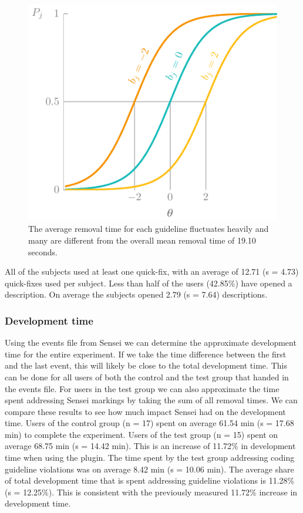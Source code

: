\begin{figure}
  \centering
  \includegraphics[page=19]{03-education/figures/tikzfigures.pdf}
  \caption[Average removal time of guidelines]{The average removal time for each guideline fluctuates heavily and many are different from the overall mean removal time of 19.10 seconds.}
  \label{fig:fixtimes}
\end{figure}

All of the subjects used at least one quick-fix, with an average of 12.71 (s = 4.73) quick-fixes used per subject.
Less than half of the users (42.85\%) have opened a description.
On average the subjects opened 2.79 (s = 7.64) descriptions.

\subsubsection{Development time}
Using the events file from Sensei we can determine the approximate development time for the entire experiment.
If we take the time difference between the first and the last event, this will likely be close to the total development time.
This can be done for all users of both the control and the test group that handed in the events file.
For users in the test group we can also approximate the time spent addressing Sensei markings by taking the sum of all removal times.
We can compare these results to see how much impact Sensei had on the development time.
Users of the control group (n = 17) spent on average 61.54 min (s = 17.68 min) to complete the experiment.
Users of the test group (n = 15) spent on average 68.75 min (s = 14.42 min).
This is an increase of 11.72\% in development time when using the plugin.
The time spent by the test group addressing coding guideline violations was on average 8.42 min (s = 10.06 min).
The average share of total development time that is spent addressing guideline violations is 11.28\% (s = 12.25\%).
This is consistent with the previously measured 11.72\% increase in development time.

